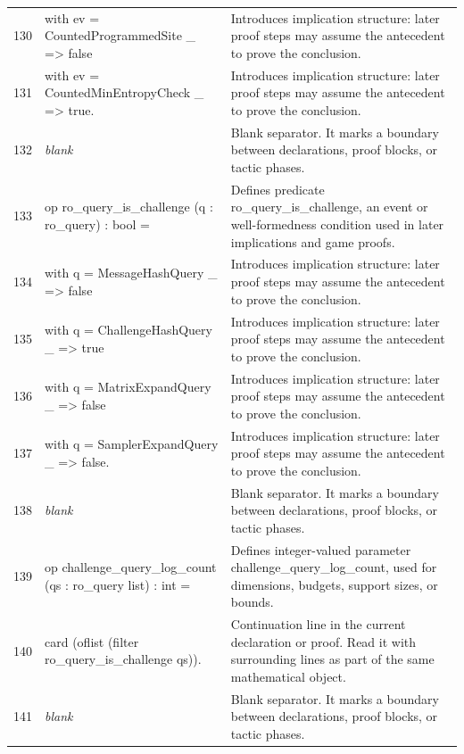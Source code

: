\documentclass[10pt]{article}
\begin{document}
\begin{longtable}{r L{0.53\textwidth} L{0.37\textwidth}}
130 & {\ttfamily\scriptsize   with ev = CountedProgrammedSite \_ => false} & Introduces implication structure: later proof steps may assume the antecedent to prove the conclusion. \\
131 & {\ttfamily\scriptsize   with ev = CountedMinEntropyCheck \_ => true.} & Introduces implication structure: later proof steps may assume the antecedent to prove the conclusion. \\
132 & {\ttfamily\scriptsize \emph{blank}} & Blank separator.  It marks a boundary between declarations, proof blocks, or tactic phases. \\
133 & {\ttfamily\scriptsize op ro\_query\_is\_challenge (q : ro\_query) : bool =} & Defines predicate ro\_query\_is\_challenge, an event or well-formedness condition used in later implications and game proofs. \\
134 & {\ttfamily\scriptsize   with q = MessageHashQuery \_ => false} & Introduces implication structure: later proof steps may assume the antecedent to prove the conclusion. \\
135 & {\ttfamily\scriptsize   with q = ChallengeHashQuery \_ => true} & Introduces implication structure: later proof steps may assume the antecedent to prove the conclusion. \\
136 & {\ttfamily\scriptsize   with q = MatrixExpandQuery \_ => false} & Introduces implication structure: later proof steps may assume the antecedent to prove the conclusion. \\
137 & {\ttfamily\scriptsize   with q = SamplerExpandQuery \_ => false.} & Introduces implication structure: later proof steps may assume the antecedent to prove the conclusion. \\
138 & {\ttfamily\scriptsize \emph{blank}} & Blank separator.  It marks a boundary between declarations, proof blocks, or tactic phases. \\
139 & {\ttfamily\scriptsize op challenge\_query\_log\_count (qs : ro\_query list) : int =} & Defines integer-valued parameter challenge\_query\_log\_count, used for dimensions, budgets, support sizes, or bounds. \\
140 & {\ttfamily\scriptsize   card (oflist (filter ro\_query\_is\_challenge qs)).} & Continuation line in the current declaration or proof.  Read it with surrounding lines as part of the same mathematical object. \\
141 & {\ttfamily\scriptsize \emph{blank}} & Blank separator.  It marks a boundary between declarations, proof blocks, or tactic phases. \\

\end{longtable}
\end{document}
